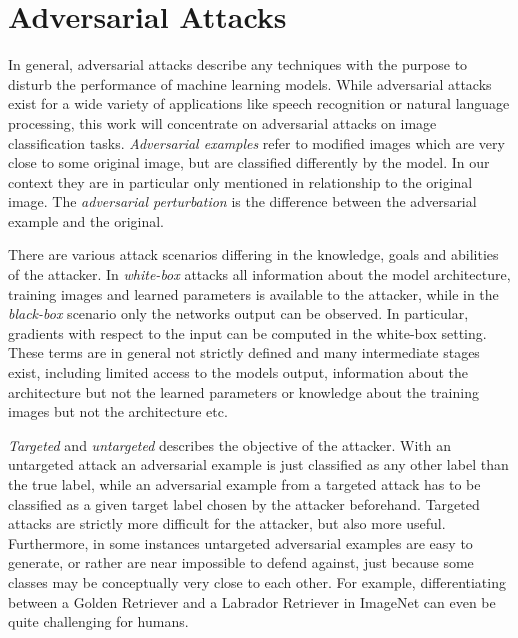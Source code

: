 
\section{Adversarial Attacks}
\label{sec:attacks}

In general, adversarial attacks describe any techniques with the purpose to disturb the performance of machine learning models.
While adversarial attacks exist for a wide variety of applications like speech recognition or natural language processing, this work will concentrate on adversarial attacks on image classification tasks.
\emph{Adversarial examples} refer to modified images which are very close to some original image, but are classified differently by the model.
In our context they are in particular only mentioned in relationship to the original image.
The \emph{adversarial perturbation} is the difference between the adversarial example and the original.

There are various attack scenarios differing in the knowledge, goals and abilities of the attacker.
In \emph{white-box} attacks all information about the model architecture, training images and learned parameters is available to the attacker, while in the \emph{black-box} scenario only the networks output can be observed.
In particular, gradients with respect to the input can be computed in the white-box setting.
These terms are in general not strictly defined and many intermediate stages exist, including limited access to the models output, information about the architecture but not the learned parameters or knowledge about the training images but not the architecture etc.

\emph{Targeted} and \emph{untargeted} describes the objective of the attacker.
With an untargeted attack an adversarial example is just classified as any other label than the true label, while an adversarial example from a targeted attack has to be classified as a given target label chosen by the attacker beforehand.
Targeted attacks are strictly more difficult for the attacker, but also more useful.
Furthermore, in some instances untargeted adversarial examples are easy to generate, or rather are near impossible to defend against, just because some classes may be conceptually very close to each other.
For example, differentiating between a Golden Retriever and a Labrador Retriever in ImageNet \citep{imagenet} can even be quite challenging for humans.

